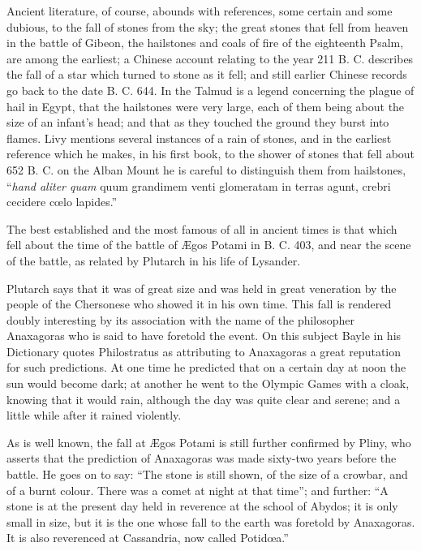 \documentclass[a4paper, 12pt, oneside]{article}
\begin{document}
Ancient literature, of course, abounds with references, some certain and some dubious, to the fall of stones from the sky; the great stones that fell from heaven in the battle of Gibeon, the hailstones and coals of fire of the eighteenth Psalm, are among the earliest; a Chinese account relating to the year 211 B. C. describes the fall of a star which turned to stone as it fell; and still earlier Chinese records go back to the date B. C. 644. In the Talmud is a legend concerning the plague of hail in Egypt, that the hailstones were very large, each of them being about the size of an infant's head; and that as they touched the ground they burst into flames. Livy mentions several instances of a rain of stones, and in the earliest reference which he makes, in his first book, to the shower of stones that fell about 652 B. C. on the Alban Mount he is careful to distinguish them from hailstones, ``\emph{hand aliter quam} quum grandimem venti glomeratam in terras agunt, crebri cecidere cœlo lapides.'' 

The best established and the most famous of all in ancient times is that which fell about the time of the battle of Ægos Potami in B. C. 403, and near the scene of the battle, as related by Plutarch in his life of Lysander. 

Plutarch says that it was of great size and was held in great veneration by the people of the Chersonese who showed it in his own time. This fall is rendered doubly interesting by its association with the name of the philosopher Anaxagoras who is said to have foretold the event. On this subject Bayle in his Dictionary quotes Philostratus as attributing to Anaxagoras a great reputation for such predictions. At one time he predicted that on a certain day at noon the sun would become dark; at another he went to the Olympic Games with a cloak, knowing that it would rain, although the day was quite clear and serene; and a little while after it rained violently. 

As is well known, the fall at Ægos Potami is still further confirmed by Pliny, who asserts that the prediction of Anaxagoras was made sixty-two years before the battle. He goes on to say: ``The stone is still shown, of the size of a crowbar, and of a burnt colour. There was a comet at night at that time''; and further: ``A stone is at the present day held in reverence at the school of Abydos; it is only small in size, but it is the one whose fall to the earth was foretold by Anaxagoras. It is also reverenced at Cassandria, now called Potidœa.''
\end{document}
